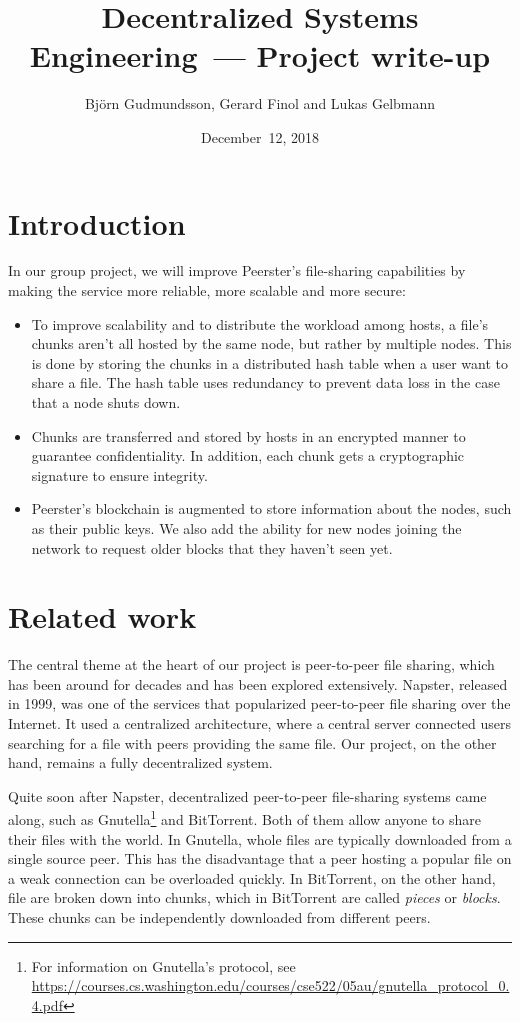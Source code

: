 \documentclass[12pt,a4paper,draft]{article}
\title{Decentralized Systems Engineering~--- Project write-up}
\author{Björn Gudmundsson, Gerard Finol and Lukas Gelbmann}
\date{December~12, 2018}
\begin{document}
\maketitle
\tableofcontents

\section{Introduction}

In our group project, we will improve Peerster's file-sharing capabilities by making the service more reliable, more scalable and more secure:

\begin{itemize}
    \item To improve scalability and to distribute the workload among hosts, a file's chunks aren't all hosted by the same node, but rather by multiple nodes.
    This is done by storing the chunks in a distributed hash table when a user want to share a file.
    The hash table uses redundancy to prevent data loss in the case that a node shuts down.
    \item Chunks are transferred and stored by hosts in an encrypted manner to guarantee confidentiality.
    In addition, each chunk gets a cryptographic signature to ensure integrity.
    \item Peerster's blockchain is augmented to store information about the nodes, such as their public keys.
    We also add the ability for new nodes joining the network to request older blocks that they haven't seen yet.
\end{itemize}

\section{Related work}

The central theme at the heart of our project is peer-to-peer file sharing, which has been around for decades and has been explored extensively.
Napster, released in 1999, was one of the services that popularized peer-to-peer file sharing over the Internet.
It used a centralized architecture, where a central server connected users searching for a file with peers providing the same file.
Our project, on the other hand, remains a fully decentralized system.

Quite soon after Napster, decentralized peer-to-peer file-sharing systems came along, such as Gnutella\footnote{For information on Gnutella's protocol, see \url{https://courses.cs.washington.edu/courses/cse522/05au/gnutella\_protocol\_0.4.pdf}} and BitTorrent.
Both of them allow anyone to share their files with the world.
In Gnutella, whole files are typically downloaded from a single source peer.
This has the disadvantage that a peer hosting a popular file on a weak connection can be overloaded quickly.
In BitTorrent, on the other hand, file are broken down into chunks, which in BitTorrent are called \emph{pieces} or \emph{blocks}.
These chunks can be independently downloaded from different peers.
\end{document}
